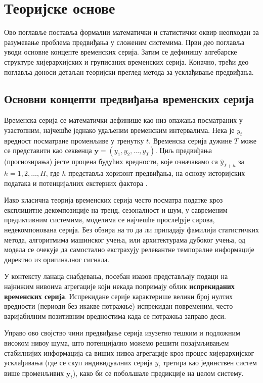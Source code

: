 \documentclass[12pt,oneside]{memoir}
\begin{document}
\chapter{Теоријске основе}
\label{chp:teorijske_osnove}

Ово поглавље поставља формални математички и статистички оквир неопходан за разумевање проблема предвиђања у сложеним системима. Први део поглавља уводи основне концепте временских серија. Затим се дефинишу алгебарске структуре хијерархијских и груписаних временских серија. Коначно, трећи део поглавља доноси детаљан теоријски преглед метода за усклађивање предвиђања.

\section{Основни концепти предвиђања временских серија}

Временска серија се математички дефинише као низ опажања посматраних у узастопним, најчешће једнако удаљеним временским интервалима. Нека је $y_t$ вредност посматране променљиве у тренутку $t$. Временска серија дужине $T$ може се представити као секвенца $\mathbf{y} = (y_1, y_2, \dots, y_T)$. Циљ предвиђања (прогнозирања) јесте процена будућих вредности, које означавамо са $\hat{y}_{T+h}$ за $h = 1, 2, \dots, H$, где $h$ представља хоризонт предвиђања, на основу историјских података и потенцијалних екстерних фактора \cite{hyndman2021forecasting}.

Иако класична теорија временских серија често посматра податке кроз експлицитне декомпозиције на тренд, сезоналност и шум, у савременим предиктивним системима, моделима се најчешће прослеђује сирова, недекомпонована серија. Без обзира на то да ли припадају фамилији статистичких метода, алгоритмима машинског учења, или архитектурама дубоког учења, од модела се очекује да самостално екстрахују релевантне темпоралне информације директно из оригиналног сигнала.

У контексту ланаца снабдевања, посебан изазов представљају подаци на најнижим нивоима агрегације који некада попримају облик \textbf{испрекиданих временских серија}. Испрекидане серије карактерише велики број нултих вредности (периоди без икакве потражње) испрекидан повременим, често варијабилним позитивним вредностима када се потражња заправо деси. 

Управо ово својство чини предвиђање серија изузетно тешким и подложним високом нивоу шума, што потенцијално можемо решити  позајмљивањем стабилнијих информација са виших нивоа агрегације кроз процес хијерархијског усклађивања (где се скуп индивидуалних серија $y_t$ третира као јединствен систем више променљивих $\mathbf{y}_t$), како би се побољшале предикције на целом систему.
\end{document}
